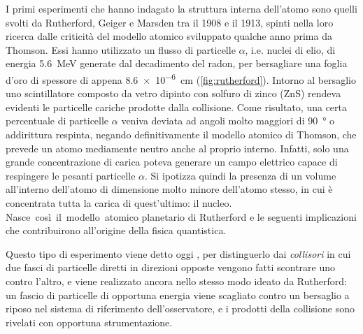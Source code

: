 \documentclass[../main.tex]{subfiles}
\begin{document}
I primi esperimenti che hanno indagato la struttura interna dell'atomo sono quelli svolti da Rutherford, Geiger e Marsden tra il 1908 e il 1913, spinti nella loro ricerca dalle criticità del modello atomico sviluppato qualche anno prima da Thomson. Essi hanno utilizzato un flusso di particelle $\alpha$, i.e. nuclei di elio, di energia \SI{5.6}{\MeV} generate dal decadimento del radon, per bersagliare una foglia d'oro di spessore di appena \SI{8.6e-6}{\cm} (\autoref{fig:rutherford}). Intorno al bersaglio uno scintillatore composto da vetro dipinto con solfuro di zinco (ZnS) rendeva evidenti le particelle cariche prodotte dalla collisione. Come risultato, una certa percentuale di particelle $\alpha$ veniva deviata ad angoli molto maggiori di \SI{90}{°} o addirittura respinta, negando definitivamente il modello atomico di Thomson, che prevede un atomo mediamente neutro anche al proprio interno. Infatti, solo una grande concentrazione di carica poteva generare un campo elettrico capace di respingere le pesanti particelle $\alpha$. Si ipotizza quindi la presenza di un volume all'interno dell'atomo di dimensione molto minore dell'atomo stesso, in cui è concentrata tutta la carica di quest'ultimo: il nucleo. \mbox{Nasce così il modello atomico} planetario di Rutherford e le seguenti implicazioni che contribuirono all'origine della fisica quantistica.

Questo tipo di esperimento viene detto oggi , per distinguerlo dai \emph{collisori} in cui due fasci di particelle diretti in direzioni opposte vengono fatti scontrare uno contro l'altro, e viene realizzato ancora nello stesso modo ideato da Rutherford: un fascio di particelle di opportuna energia viene scagliato contro un bersaglio a riposo nel sistema di riferimento dell'osservatore, e i prodotti della collisione sono rivelati con opportuna strumentazione.
\end{document}
